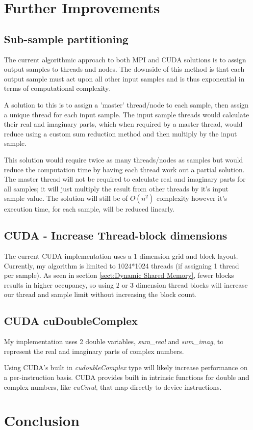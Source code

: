 \documentclass[11pt,a4paper]{article}
\begin{document}
\section{Further Improvements}
\subsection{Sub-sample partitioning}
The current algorithmic approach to both MPI and CUDA solutions is to assign output samples to threads and nodes. The downside of this method is that each output sample must act upon all other input samples and is thus exponential in terms of computational complexity.

A solution to this is to assign a 'master' thread/node to each sample, then assign a unique thread for each input sample. The input sample threads would calculate their real and imaginary parts, which when required by a master thread, would reduce using a custom sum reduction method and then multiply by the input sample.

This solution would require twice as many threads/nodes as samples but would reduce the computation time by having each thread work out a partial solution. The master thread will not be required to calculate real and imaginary parts for all samples; it will just multiply the result from other threads by it's input sample value. The solution will still be of $O(n^2)$ complexity however it's execution time, for each sample, will be reduced linearly.

\subsection{CUDA - Increase Thread-block dimensions}
The current CUDA implementation uses a 1 dimension grid and block layout. Currently, my algorithm is limited to 1024*1024 threads (if assigning 1 thread per sample). As seen in section \ref{sect:Dynamic Shared Memory}, fewer blocks results in higher occupancy, so using 2 or 3 dimension thread blocks will increase our thread and sample limit without increasing the block count. 

\subsection{CUDA cuDoubleComplex}
My implementation uses 2 double variables, \textit{sum\_real} and \textit{sum\_imag}, to represent the real and imaginary parts of complex numbers.

Using CUDA's built in \textit{cudoubleComplex} type will likely increase performance on a per-instruction basis. CUDA provides built in intrinsic functions for double and complex numbers, like \textit{cuCmul}, that map directly to device instructions.

\newpage
\section{Conclusion}

\newpage
 
\end{document}
